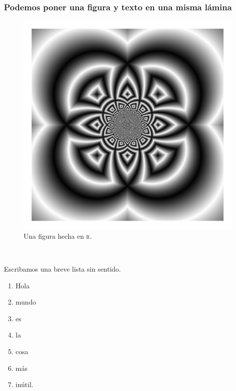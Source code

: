 \documentclass{beamer}
\begin{document}
\begin{frame}
    \frametitle{Podemos poner una figura y texto en una misma lámina}

    \begin{minipage}[b]{0.3\textwidth}
        \begin{figure}[ht]
            \centering
            \includegraphics[width = \textwidth]{images/81.png}
            \caption{Una figura hecha en \textsc{r}.}
            \label{fig:mi figura}
        \end{figure}
    \end{minipage}
    ~
    \begin{minipage}[b]{0.65\textwidth}
        Escribamos una breve lista sin sentido.
        \begin{enumerate}
            \item Hola
            \item mundo
            \item es
            \item la 
            \item cosa
            \item más
            \item inútil.
        \end{enumerate}
    \end{minipage}

\end{frame}
\end{document}
